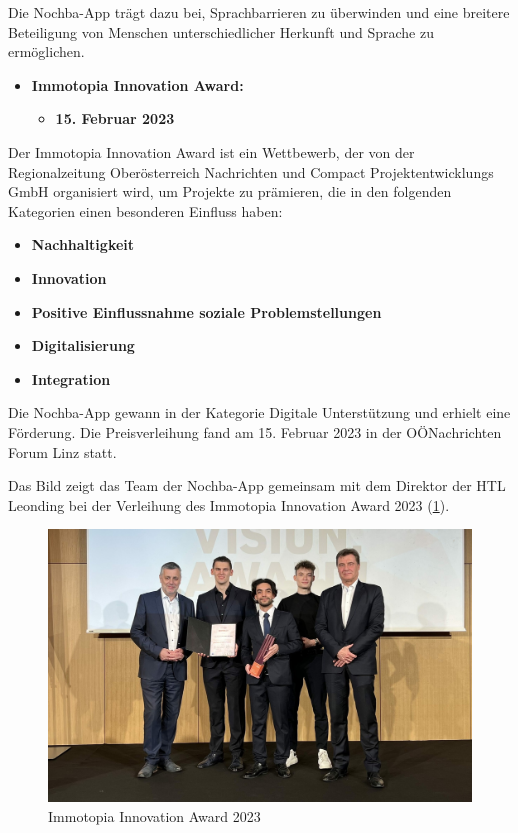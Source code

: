 Die Nochba-App trägt dazu bei, Sprachbarrieren zu überwinden und eine breitere Beteiligung von Menschen unterschiedlicher Herkunft und Sprache zu ermöglichen.


\begin{itemize}
    \item \textbf{Immotopia Innovation Award:}
          \begin{itemize}
              \item \textbf{15. Februar 2023}
          \end{itemize}
\end{itemize}

Der Immotopia Innovation Award \cite{immotopia-nochba} ist ein Wettbewerb, der von der Regionalzeitung Oberösterreich Nachrichten und Compact Projektentwicklungs GmbH organisiert wird, um Projekte zu prämieren, die in den folgenden Kategorien einen besonderen Einfluss haben:

\begin{itemize}
    \item \textbf{Nachhaltigkeit}
    \item \textbf{Innovation}
    \item \textbf{Positive Einflussnahme soziale Problemstellungen}
    \item \textbf{Digitalisierung}
    \item \textbf{Integration}
\end{itemize}

Die Nochba-App gewann in der Kategorie Digitale Unterstützung und erhielt eine Förderung. Die Preisverleihung fand am 15. Februar 2023 in der OÖNachrichten Forum Linz statt. 

Das Bild zeigt das Team der Nochba-App gemeinsam mit dem Direktor der HTL Leonding bei der Verleihung des Immotopia Innovation Award 2023 (\ref{fig:Immotopia2023}).

\begin{figure}[H]
    \centering
    \includegraphics[width=1\textwidth]{pics/Immotopia-2023.jpg}
    \caption{Immotopia Innovation Award 2023}
    \label{fig:Immotopia2023}
\end{figure}

